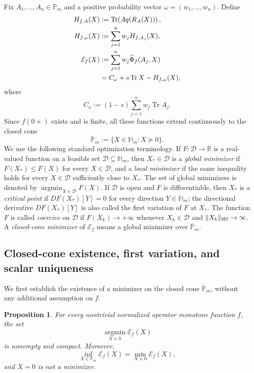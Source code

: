 \documentclass[11pt]{amsart}
\newtheorem{proposition}[theorem]{Proposition}
\theoremstyle{definition}
\theoremstyle{remark}
\newcommand{\Pm}{\mathbb P_m}
\newcommand{\Hm}{\mathbb H_m}
\newcommand{\Tr}{\operatorname{Tr}}
\newcommand{\altPhi}{\widehat{\Phi}}
\begin{document}
Fix $A_1,\ldots,A_n\in\Pm$ and a positive probability vector
$\omega=(w_1,\ldots,w_n)$.
	Define
	\begin{align}
		H_{f,A}(X)
		&:=\Tr\!\left(Aq(R_A(X))\right), \label{eq:HfA}\\
		H_{f,\omega}(X)
		&:=\sum_{j=1}^n w_jH_{f,A_j}(X), \label{eq:Hfomega}\\
		\mathcal E_f(X)
		&:=\sum_{j=1}^n w_j\altPhi_f(A_j,X) \notag\\
		&=C_\omega+s\Tr X-H_{f,\omega}(X), \label{eq:energy}
	\end{align}
	where
	\[
	C_\omega:=(1-s)\sum_{j=1}^n w_j\Tr A_j.
	\]
Since $f(0+)$ exists and is finite, all these functions extend
	continuously to the closed cone
	\[
	\overline{\mathbb{P}}_m:=\{X\in\Hm:X\succeq0\}.
	\]
	We use the following standard optimization terminology.  If
	$F:\mathcal D\to\mathbb R$ is a real-valued function on a feasible set
	$\mathcal D\subseteq\Hm$, then $X_*\in\mathcal D$ is a
	\emph{global minimizer} if
	$F(X_*)\le F(X)$ for every $X\in\mathcal D$, and a \emph{local
		minimizer} if the same inequality holds for every $X\in\mathcal D$
	sufficiently close to $X_*$.  The set of global minimizers is denoted by
	$\operatorname*{argmin}_{X\in\mathcal D}F(X)$.  If $\mathcal D$ is open
	and $F$ is differentiable, then $X_*$ is a \emph{critical point} if
	$DF(X_*)[Y]=0$ for every direction $Y\in\Hm$; the directional derivative
	$DF(X_*)[Y]$ is also called the first variation of $F$ at $X_*$.  The
	function $F$ is called \emph{coercive} on $\mathcal D$ if
	$F(X_k)\to+\infty$ whenever $X_k\in\mathcal D$ and
	$\|X_k\|_{\rm HS}\to\infty$.  A \emph{closed-cone minimizer} of
	$\mathcal E_f$ means a global minimizer over $\overline{\mathbb{P}}_m$.
	
 
	
	\subsection{Closed-cone existence, first variation, and scalar uniqueness}
	
We first establish the existence of a minimizer on the closed cone
	$\overline{\mathbb{P}}_m$, without any additional assumption on $f$.

\begin{proposition}
		\label{prop:closed-cone}
		For every nontrivial normalized operator monotone function $f$, the set
		\[
		\operatorname*{argmin}_{X\succeq0}\mathcal E_f(X)
		\]
		is nonempty and compact.  Moreover,
		\begin{equation}\label{eq:open-closed}
			\inf_{X\in\Pm}\mathcal E_f(X)
			=\min_{X\succeq0}\mathcal E_f(X),
		\end{equation}
		and $X=0$ is not a minimizer.
	\end{proposition}
	
\end{document}
